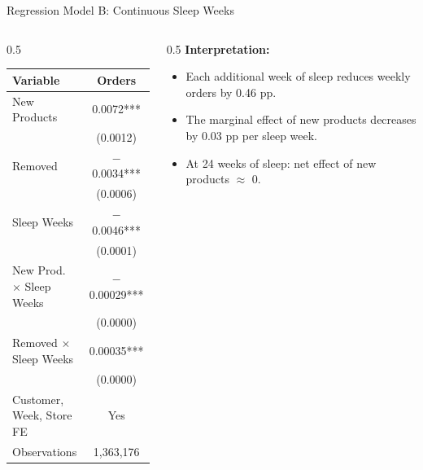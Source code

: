 \documentclass[aspectratio=169]{beamer}  %
\begin{document}
\begin{frame}{Regression Model B: Continuous Sleep Weeks}
    \begin{columns}[T]
        \begin{column}{0.5\textwidth}
            \begin{table}
            \centering
            \scriptsize
            \begin{tabular}{lc}
            \toprule
            \textbf{Variable} & \textbf{Orders} \\
            \midrule
            New Products & 0.0072*** \\
             & (0.0012) \\
            Removed & $-$0.0034*** \\
             & (0.0006) \\
            Sleep Weeks & $-$0.0046*** \\
             & (0.0001) \\
            New Prod. $\times$ Sleep Weeks & $-$0.00029*** \\
             & (0.0000) \\
            Removed $\times$ Sleep Weeks & 0.00035*** \\
             & (0.0000) \\
            \midrule
            Customer, Week, Store FE & Yes \\
            Observations & 1,363,176 \\
            \bottomrule
            \end{tabular}
            \end{table}
        \end{column}
        
        \begin{column}{0.5\textwidth}
            \vspace{0.5cm}
            \textbf{Interpretation:}
            \begin{itemize}
                \item Each additional week of sleep reduces weekly orders by 0.46 pp.
                \item The marginal effect of new products decreases by 0.03 pp per sleep week.
                \item At 24 weeks of sleep: net effect of new products $\approx$ 0.
            \end{itemize}
        \end{column}
    \end{columns}
\end{frame}
\end{document}
